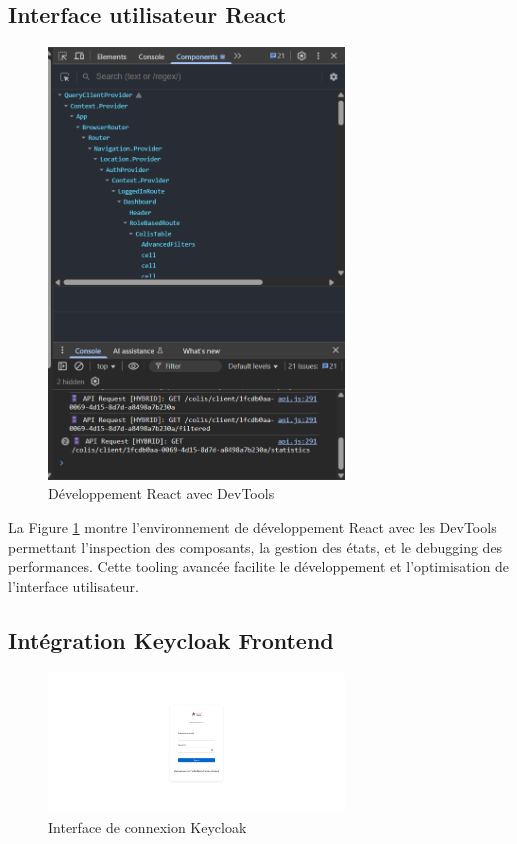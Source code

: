 \subsection{Interface utilisateur React}

\begin{figure}[H]
\centering
\includegraphics[width=0.7\textwidth]{images/react_dev_tools.png}
\caption{Développement React avec DevTools}
\label{fig:react_dev_tools}
\end{figure}

La Figure \ref{fig:react_dev_tools} montre l'environnement de développement React avec les DevTools permettant l'inspection des composants, la gestion des états, et le debugging des performances. Cette tooling avancée facilite le développement et l'optimisation de l'interface utilisateur.

\subsection{Intégration Keycloak Frontend}

\begin{figure}[H]
\centering
\includegraphics[width=0.7\textwidth]{images/keycloak_login.png}
\caption{Interface de connexion Keycloak}
\label{fig:keycloak_login}
\end{figure}


